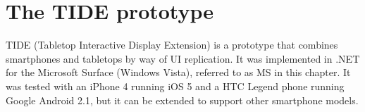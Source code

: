 

\chapter{The TIDE prototype}
\label{system}

TIDE (Tabletop Interactive Display Extension) is a prototype that combines smartphones and tabletops by way of UI replication.
It was implemented in .NET for the Microsoft Surface (Windows Vista), referred to as MS in this chapter.
It was tested with an iPhone 4 running iOS 5 and a HTC Legend phone running Google Android 2.1, but it can be extended to support other smartphone models.

